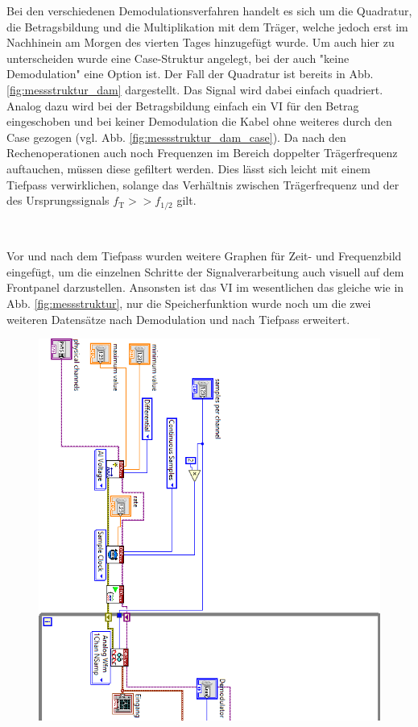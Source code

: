 		Bei den verschiedenen Demodulationsverfahren handelt es sich um die Quadratur, die Betragsbildung und die Multiplikation mit dem Träger, welche jedoch erst im Nachhinein am Morgen des vierten Tages hinzugefügt wurde.
		Um auch hier zu unterscheiden wurde eine Case-Struktur angelegt, bei der auch "keine Demodulation" eine Option ist.
		Der Fall der Quadratur ist bereits in Abb. \ref{fig:messstruktur_dam} dargestellt.
		Das Signal wird dabei einfach quadriert.
		Analog dazu wird bei der Betragsbildung einfach ein VI für den Betrag eingeschoben und bei keiner Demodulation die Kabel ohne weiteres durch den Case gezogen (vgl. Abb. \ref{fig:messstruktur_dam_case}). 
		Da nach den Rechenoperationen auch noch Frequenzen im Bereich doppelter Trägerfrequenz auftauchen, müssen diese gefiltert werden.
		Dies lässt sich leicht mit einem Tiefpass verwirklichen, solange das Verhältnis zwischen Trägerfrequenz und der des Ursprungssignals $f_\text{T} >> f_{1/2}$ gilt.
			
		\
		
		Vor und nach dem Tiefpass wurden weitere Graphen für Zeit- und Frequenzbild eingefügt, um die einzelnen Schritte der Signalverarbeitung auch visuell auf dem Frontpanel darzustellen.
		Ansonsten ist das VI im wesentlichen das gleiche wie in Abb. \ref{fig:messstruktur}, nur die Speicherfunktion wurde noch um die zwei weiteren Datensätze nach Demodulation und nach Tiefpass erweitert.
		
		\newpage
		\pagestyle{empty}
		
		\begin{figure}[H]
			\centering
			\includegraphics[width=\textwidth]{pic/messstruktur_dam1.png}
		\end{figure} 
	
